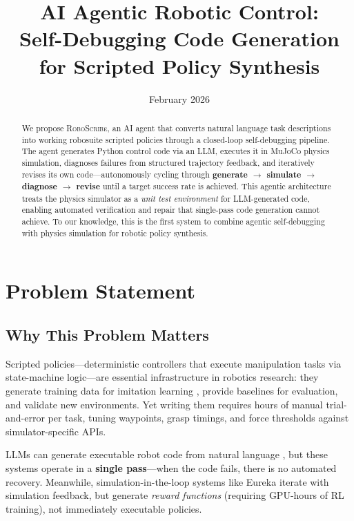 \documentclass[11pt]{article}
\title{\textbf{AI Agentic Robotic Control:} \\[0.3em]
\large Self-Debugging Code Generation for Scripted Policy Synthesis}
\author{
}
\date{February 2026}
\begin{document}
\maketitle

\begin{abstract}
We propose \textsc{RoboScribe}, an AI agent that converts natural language task descriptions into working robosuite scripted policies through a closed-loop self-debugging pipeline. The agent generates Python control code via an LLM, executes it in MuJoCo physics simulation, diagnoses failures from structured trajectory feedback, and iteratively revises its own code---autonomously cycling through \textbf{generate $\to$ simulate $\to$ diagnose $\to$ revise} until a target success rate is achieved. This agentic architecture treats the physics simulator as a \emph{unit test environment} for LLM-generated code, enabling automated verification and repair that single-pass code generation cannot achieve. To our knowledge, this is the first system to combine agentic self-debugging with physics simulation for robotic policy synthesis.
\end{abstract}

\section{Problem Statement}
\label{sec:problem}

\subsection{Why This Problem Matters}

Scripted policies---deterministic controllers that execute manipulation tasks via state-machine logic---are essential infrastructure in robotics research: they generate training data for imitation learning \citep{mandlekar2022robomimic}, provide baselines for evaluation, and validate new environments. Yet writing them requires hours of manual trial-and-error per task, tuning waypoints, grasp timings, and force thresholds against simulator-specific APIs.

LLMs can generate executable robot code from natural language \citep{liang2023code, singh2023progprompt}, but these systems operate in a \textbf{single pass}---when the code fails, there is no automated recovery. Meanwhile, simulation-in-the-loop systems like Eureka \citep{ma2024eureka} iterate with simulation feedback, but generate \emph{reward functions} (requiring GPU-hours of RL training), not immediately executable policies.
\end{document}
